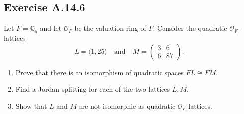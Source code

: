 \documentclass[12pt, a4paper]{article}
\begin{document}
\subsection*{Exercise A.14.6}
Let $F = \mathbb{Q}_5$ and let $\mathcal{O}_F$ be the valuation ring of $F$. Consider the quadratic $\mathcal{O}_F$-lattices
\[ L = \langle 1, 25 \rangle \quad \text{and} \quad M = \begin{pmatrix} 3 & 6 \\ 6 & 87 \end{pmatrix}. \]
\begin{enumerate}
    \item Prove that there is an isomorphism of quadratic spaces $FL \cong FM$.
    \item Find a Jordan splitting for each of the two lattices $L, M$.
    \item Show that $L$ and $M$ are not isomorphic as quadratic $\mathcal{O}_F$-lattices.
\end{enumerate}
\end{document}
